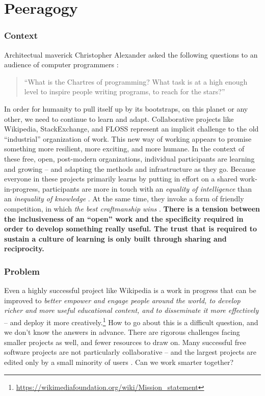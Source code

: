 \section{Peeragogy}\label{sec:Peeragogy}

\subsubsection*{Context}  Architectual maverick Christopher Alexander asked the following questions to an audience of computer programmers \cite{alexander1999origins}: 
\begin{quote}
``What is the Chartres of programming? What task is at a high enough level to inspire people writing programs, to reach for the stars?''
\end{quote}
In order for humanity to pull itself up by its bootstraps, on this planet or any other, we need to continue to learn and adapt.  Collaborative projects like Wikipedia, StackExchange, and FLOSS represent an implicit challenge to the old ``industrial'' organization of work.  This new way of working appears to promise something more resilient, more exciting, and more humane.  In the context of these free, open, post-modern organizations, individual participants are learning and growing -- and adapting the methods and infrastructure as they go.
Because everyone in these projects primarily learns by putting in effort on a shared work-in-progress, participants are more in touch with an \emph{equality of intelligence} than an \emph{inequality of knowledge} \cite[pp.~38,119]{ranciere1991ignorant}.
At the same time, they invoke a form of friendly competition, in which \emph{the best craftmanship wins} \cite[p.~89]{raymond2001cathedral}.  
\textbf{There is a tension between the inclusiveness of an ``open'' work and the specificity required in order to develop something really useful.  The trust that is required to sustain a culture of learning is only built through sharing and reciprocity.}

\subsubsection*{Problem} Even a highly successful project like Wikipedia is a work in progress that can be improved to \emph{\emph{better} empower and engage people around the world, to develop \emph{richer and more useful} educational content, and to disseminate it \emph{more} effectively} -- and deploy it more creatively.\footnote{\url{https://wikimediafoundation.org/wiki/Mission_statement}}  How to go about this is a difficult question, and we don't know the answers in advance.  There are rigorous challenges facing smaller projects as well, and fewer resources to draw on.  Many successful free software projects are not particularly collaborative -- and the largest projects are edited only by a small minority of users \cite{free-software-better,who-writes-wikipedia}.  Can we work smarter together?

